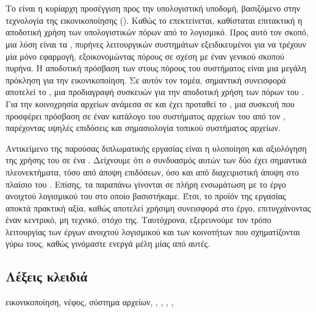 \chapter*{\abstractname}

Το  είναι η κυρίαρχη προσέγγιση προς την υπολογιστική
υποδομή, βασιζόμενο στην τεχνολογία της εικονικοποίησης ().
Καθώς το  επεκτείνεται, καθίσταται επιτακτική η αποδοτική χρήση των
υπολογιστικών πόρων από το λογισμικό. Προς αυτό τον σκοπό, μια λύση είναι τα
\emph{}, πυρήνες λειτουργικών συστημάτων εξειδικευμένοι για να
τρέχουν μία μόνο εφαρμογή, εξοικονομώντας πόρους σε σχέση με έναν γενικού σκοπού
πυρήνα. Η αποδοτική πρόσβαση των  στους πόρους του
\host{} συστήματος είναι μια μεγάλη πρόκληση για την εικονικοποίηση. Σε αυτόν
τον τομέα, σημαντική συνεισφορά αποτελεί το \emph{}, μια προδιαγραφή
 συσκευών για την αποδοτική χρήση των πόρων του \host{}.
Για την κοινοχρησία αρχείων ανάμεσα σε \host{} και \guest{} έχει προταθεί το
\emph{\viofs{}}, μια  συσκευή που προσφέρει πρόσβαση σε έναν κατάλογο
του συστήματος αρχείων του \host{} από τον \guest{}, παρέχοντας υψηλές επιδόσεις
και σημασιολογία τοπικού συστήματος αρχείων.

Αντικείμενο της παρούσας διπλωματικής εργασίας είναι η υλοποίηση και αξιολόγηση
της χρήσης του \viofs{} σε ένα . Δείχνουμε ότι ο συνδυασμός αυτών
των δύο έχει σημαντικά πλεονεκτήματα, τόσο από άποψη επιδόσεων, όσο και από
διαχειριστική άποψη στο πλαίσιο του . Επίσης, τα παραπάνω γίνονται
σε πλήρη ενσωμάτωση με το έργο ανοιχτού λογισμικού του  στο οποίο
βασιστήκαμε. Έτσι, το προϊόν της εργασίας αποκτά πρακτική αξία, καθώς αποτελεί
χρήσιμη συνεισφορά στο έργο, επιτυγχάνοντας έναν κεντρικό, μη τεχνικό, στόχο
της. Ταυτόχρονα, εξερευνούμε τον τρόπο λειτουργίας των έργων ανοιχτού λογισμικού
και των κοινοτήτων που σχηματίζονται γύρω τους, καθώς γινόμαστε ενεργά μέλη μίας
από αυτές.

\section*{Λέξεις κλειδιά}
\noindent
εικονικοποίηση, νέφος, σύστημα αρχείων, , , \osv{},
\viofs{}, \qemu{}
